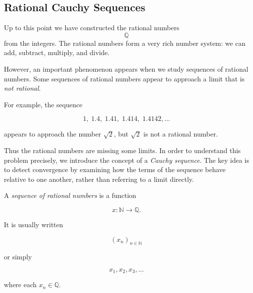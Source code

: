 
\subsection{Rational Cauchy Sequences}


\begin{remark}
\label{rem:cauchy-teacher}

Up to this point we have constructed the rational numbers
\[
\mathbb{Q}
\]
from the integers.  The rational numbers form a very rich number system:
we can add, subtract, multiply, and divide.

However, an important phenomenon appears when we study sequences of
rational numbers.  Some sequences of rational numbers appear to
approach a limit that is \emph{not rational}.

For example, the sequence

\[
1,\;1.4,\;1.41,\;1.414,\;1.4142,\dots
\]

appears to approach the number $\sqrt{2}$, but $\sqrt{2}$ is not a
rational number.

Thus the rational numbers are missing some limits.  In order to
understand this problem precisely, we introduce the concept of a
\emph{Cauchy sequence}.  The key idea is to detect convergence by
examining how the terms of the sequence behave relative to one another,
rather than referring to a limit directly.

\end{remark}


\begin{definition}
\label{def:rational-sequence}

A \emph{sequence of rational numbers} is a function

\[
x : \mathbb{N} \rightarrow \mathbb{Q}.
\]

It is usually written

\[
(x_n)_{n\in\mathbb{N}}
\]

or simply

\[
x_1,x_2,x_3,\dots
\]

where each $x_n \in \mathbb{Q}$.

\end{definition}

